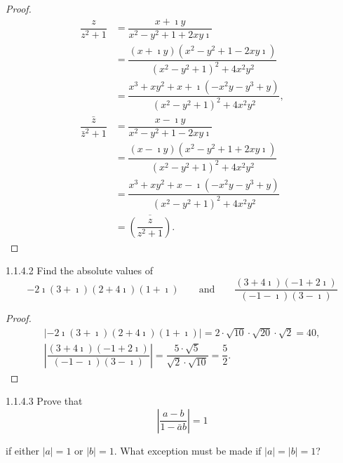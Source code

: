 \begin{proof}
	\begingroup
	\allowdisplaybreaks%
	\begin{align*}
		\dfrac{z}{z^{2} + 1}             & = \dfrac{x + \imath y}{x^{2} - y^{2} + 1 + 2xy \imath}                                                \\
		                                 & = \dfrac{(x + \imath y)(x^{2} - y^{2} + 1 - 2xy \imath)}{{(x^{2} - y^{2} + 1)}^{2} + 4x^{2}y^{2}}     \\
		                                 & = \dfrac{x^{3} + xy^{2} + x + \imath (-x^{2}y - y^{3} + y)}{{(x^{2} - y^{2} + 1)}^{2} + 4x^{2}y^{2}}, \\
		\dfrac{\bar{z}}{\bar{z}^{2} + 1} & = \dfrac{x - \imath y}{x^{2} - y^{2} + 1 - 2xy \imath}                                                \\
		                                 & = \dfrac{(x - \imath y)(x^{2} - y^{2} + 1 + 2xy \imath)}{{(x^{2} - y^{2} + 1)}^{2} + 4x^{2}y^{2}}     \\
		                                 & = \dfrac{x^{3} + xy^{2} + x - \imath(-x^{2}y - y^{3} + y)}{{(x^{2} - y^{2} + 1)}^{2} + 4x^{2}y^{2}}   \\
		                                 & = \overline{\left( \dfrac{z}{z^{2} + 1} \right)}.
	\end{align*}
	\endgroup
\end{proof}

\begin{problem}{1.1.4.2}
Find the absolute values of
\[
	-2\imath (3 + \imath)(2 + 4\imath)(1 + \imath) \qquad \text{and} \qquad \dfrac{(3 + 4\imath)(-1 + 2\imath)}{(-1 - \imath)(3 - \imath)}
\]
\end{problem}

\begin{proof}
	\[
		\begin{split}
			\left\vert -2\imath (3 + \imath)(2 + 4\imath)(1 + \imath) \right\vert = 2\cdot \sqrt{10} \cdot \sqrt{20}\cdot \sqrt{2} = 40, \\
			\left\vert \dfrac{(3 + 4\imath)(-1 + 2\imath)}{(-1 - \imath)(3 - \imath)} \right\vert = \dfrac{5\cdot \sqrt{5}}{\sqrt{2}\cdot\sqrt{10}} = \dfrac{5}{2}.
		\end{split}
	\]
\end{proof}

\begin{problem}{1.1.4.3}
Prove that
\[
	\left\vert \dfrac{a - b}{1 - \bar{a}b} \right\vert = 1
\]

if either \( \left\vert a \right\vert = 1 \) or \( \left\vert b \right\vert = 1 \). What exception must be made if \( \left\vert a \right\vert = \left\vert b \right\vert = 1 \)?
\end{problem}

